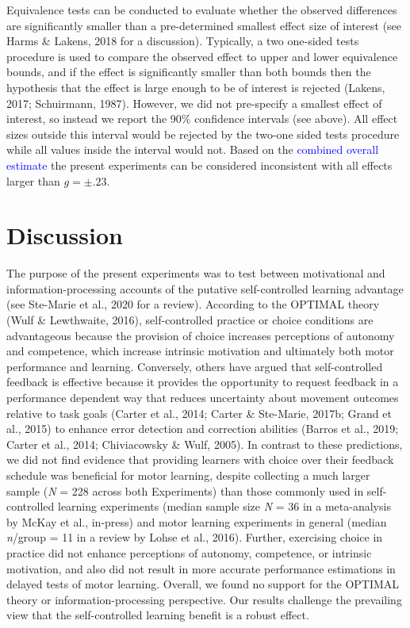\documentclass[
  man, donotrepeattitle,floatsintext]{apa7}
\begin{document}
Equivalence tests can be conducted to evaluate whether the observed differences are significantly smaller than a pre-determined smallest effect size of interest (see Harms \& Lakens, 2018 for a discussion). Typically, a two one-sided tests procedure is used to compare the observed effect to upper and lower equivalence bounds, and if the effect is significantly smaller than both bounds then the hypothesis that the effect is large enough to be of interest is rejected (Lakens, 2017; Schuirmann, 1987). However, we did not pre-specify a smallest effect of interest, so instead we report the 90\% confidence intervals (see above). All effect sizes outside this interval would be rejected by the two-one sided tests procedure while all values inside the interval would not. Based on the \textcolor{blue}{combined overall estimate} the present experiments can be considered inconsistent with all effects larger than \(g = \pm.23\).

\hypertarget{discussion}{%
\section{Discussion}\label{discussion}}

The purpose of the present experiments was to test between motivational and information-processing accounts of the putative self-controlled learning advantage (see Ste-Marie et al., 2020 for a review). According to the OPTIMAL theory (Wulf \& Lewthwaite, 2016), self-controlled practice or choice conditions are advantageous because the provision of choice increases perceptions of autonomy and competence, which increase intrinsic motivation and ultimately both motor performance and learning. Conversely, others have argued that self-controlled feedback is effective because it provides the opportunity to request feedback in a performance dependent way that reduces uncertainty about movement outcomes relative to task goals (Carter et al., 2014; Carter \& Ste-Marie, 2017b; Grand et al., 2015) to enhance error detection and correction abilities (Barros et al., 2019; Carter et al., 2014; Chiviacowsky \& Wulf, 2005). In contrast to these predictions, we did not find evidence that providing learners with choice over their feedback schedule was beneficial for motor learning, despite collecting a much larger sample (\emph{N} = 228 across both Experiments) than those commonly used in self-controlled learning experiments (median sample size \emph{N} = 36 in a meta-analysis by McKay et al., in-press) and motor learning experiments in general (median \emph{n}/group = 11 in a review by Lohse et al., 2016). Further, exercising choice in practice did not enhance perceptions of autonomy, competence, or intrinsic motivation, and also did not result in more accurate performance estimations in delayed tests of motor learning. Overall, we found no support for the OPTIMAL theory or information-processing perspective. Our results challenge the prevailing view that the self-controlled learning benefit is a robust effect.
\end{document}
